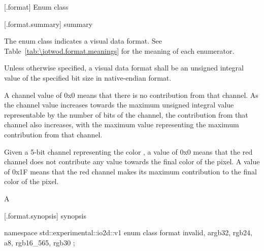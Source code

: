  [\iotwod.format] {Enum class }

 [\iotwod.format.summary] { summary}

\pnum
The  enum class indicates a visual data format. See Table~\ref{tab:\iotwod.format.meanings} for 
the meaning of each  enumerator.

%
%
\pnum
Unless otherwise specified, a visual data format shall be an unsigned integral
value of the specified bit size in native-endian format.

%
\pnum
A channel value of 0x0 means that there is no contribution from that channel. 
As the channel value increases towards the maximum unsigned integral value 
representable by the number of bits of the channel, the contribution from that 
channel also increases, with the maximum value representing the maximum
contribution from that channel.
\begin{example}
Given a 5-bit channel representing the color , a value of 0x0 means that the red channel does not 
contribute any value towards the final color of the pixel. A value of 0x1F 
means that the red channel makes its maximum contribution to the final color of 
the pixel.

A
\end{example}

 [\iotwod.format.synopsis] { synopsis}

\begin{codeblock}
namespace std::experimental::io2d::v1 {
  enum class format {
    invalid,
    argb32,
    rgb24,
    a8,
    rgb16_565,
    rgb30
  };
}
\end{codeblock}

